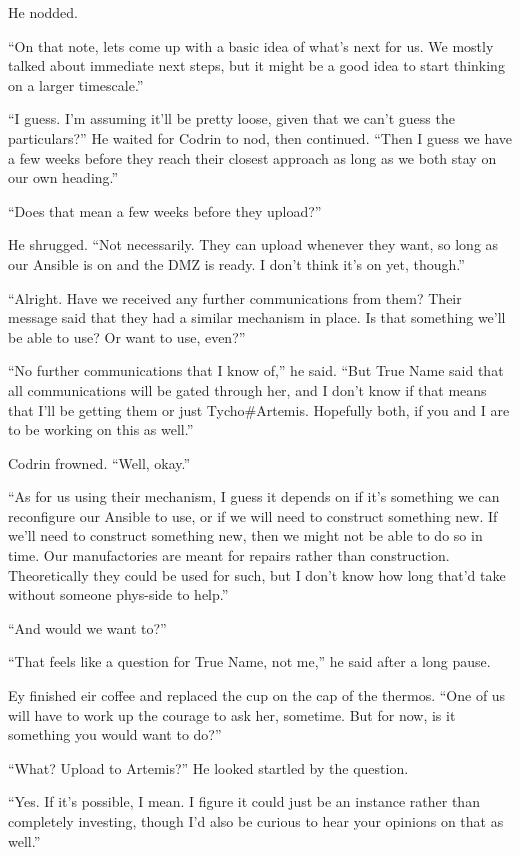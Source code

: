 He nodded.

``On that note, lets come up with a basic idea of what's next for us. We mostly talked about immediate next steps, but it might be a good idea to start thinking on a larger timescale.''

``I guess. I'm assuming it'll be pretty loose, given that we can't guess the particulars?'' He waited for Codrin to nod, then continued. ``Then I guess we have a few weeks before they reach their closest approach as long as we both stay on our own heading.''

``Does that mean a few weeks before they upload?''

He shrugged. ``Not necessarily. They can upload whenever they want, so long as our Ansible is on and the DMZ is ready. I don't think it's on yet, though.''

``Alright. Have we received any further communications from them? Their message said that they had a similar mechanism in place. Is that something we'll be able to use? Or want to use, even?''

``No further communications that I know of,'' he said. ``But True Name said that all communications will be gated through her, and I don't know if that means that I'll be getting them or just Tycho\#Artemis. Hopefully both, if you and I are to be working on this as well.''

Codrin frowned. ``Well, okay.''

``As for us using their mechanism, I guess it depends on if it's something we can reconfigure our Ansible to use, or if we will need to construct something new. If we'll need to construct something new, then we might not be able to do so in time. Our manufactories are meant for repairs rather than construction. Theoretically they could be used for such, but I don't know how long that'd take without someone phys-side to help.''

``And would we want to?''

``That feels like a question for True Name, not me,'' he said after a long pause.

Ey finished eir coffee and replaced the cup on the cap of the thermos. ``One of us will have to work up the courage to ask her, sometime. But for now, is it something you would want to do?''

``What? Upload to Artemis?'' He looked startled by the question.

``Yes. If it's possible, I mean. I figure it could just be an instance rather than completely investing, though I'd also be curious to hear your opinions on that as well.''

